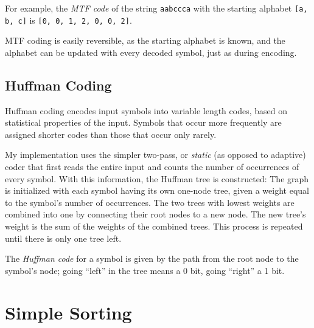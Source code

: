 \documentclass[a4paper]{scrreprt}
\begin{document}
For example, the \emph{MTF code} of the string \texttt{aabccca} with the
starting alphabet \texttt{[a, b, c]} is \texttt{[0, 0, 1, 2, 0, 0, 2]}.

MTF coding is easily reversible, as the starting alphabet is known, and the
alphabet can be updated with every decoded symbol, just as during encoding.

\section{Huffman Coding}

Huffman coding encodes input symbols into variable length codes, based on
statistical properties of the input. Symbols that occur more frequently are
assigned shorter codes than those that occur only rarely.

My implementation uses the simpler two-pass, or \emph{static} (as opposed
to adaptive) coder that first reads the entire input and counts the number of
occurrences of every symbol. With this information, the Huffman tree is
constructed: The graph is initialized with each symbol having its own one-node
tree, given a weight equal to the symbol's number of occurrences. The two trees
with lowest weights are combined into one by connecting their root nodes to a
new node. The new tree's weight is the sum of the weights of the combined trees.
This process is repeated until there is only one tree left.

The \emph{Huffman code} for a symbol is given by the path from the root node to
the symbol's node; going ``left'' in the tree means a 0 bit, going ``right'' a 1
bit.

\chapter{Simple Sorting}
\end{document}
